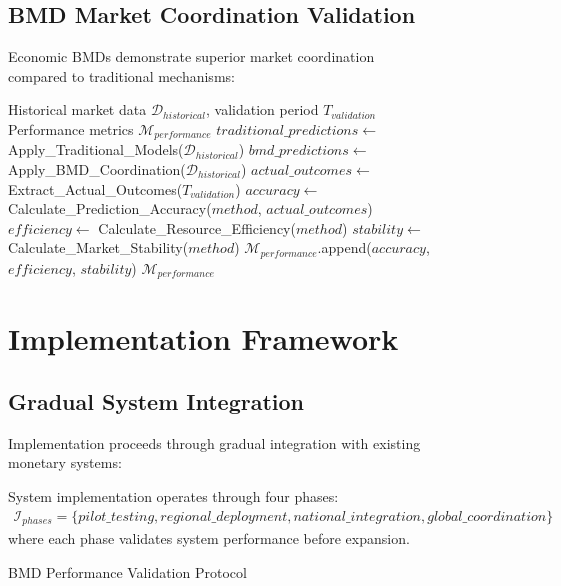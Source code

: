 \begin{figure}[h]
    \subsection{BMD Market Coordination Validation}
    
    Economic BMDs demonstrate superior market coordination compared to traditional mechanisms:
    
    \begin{algorithm}
    \caption{BMD Performance Validation Protocol}
    \begin{algorithmic}[1]
    \REQUIRE Historical market data $\mathcal{D}_{historical}$, validation period $T_{validation}$
    \ENSURE Performance metrics $\mathcal{M}_{performance}$
    \STATE $traditional\_predictions \leftarrow$ Apply\_Traditional\_Models($\mathcal{D}_{historical}$)
    \STATE $bmd\_predictions \leftarrow$ Apply\_BMD\_Coordination($\mathcal{D}_{historical}$)
    \STATE $actual\_outcomes \leftarrow$ Extract\_Actual\_Outcomes($T_{validation}$)
        \STATE $accuracy \leftarrow$ Calculate\_Prediction\_Accuracy($method$, $actual\_outcomes$)
        \STATE $efficiency \leftarrow$ Calculate\_Resource\_Efficiency($method$)
        \STATE $stability \leftarrow$ Calculate\_Market\_Stability($method$)
        \STATE $\mathcal{M}_{performance}$.append($accuracy$, $efficiency$, $stability$)
    \ENDFOR
    \RETURN $\mathcal{M}_{performance}$
    \end{algorithmic}
    \end{algorithm}
    
    \section{Implementation Framework}
    
    \subsection{Gradual System Integration}
    
    Implementation proceeds through gradual integration with existing monetary systems:
    
    \begin{definition}
    System implementation operates through four phases:
    \begin{align}
    \mathcal{I}_{phases} = \{pilot\_testing, regional\_deployment, national\_integration, global\_coordination\}
    \end{align}
    where each phase validates system performance before expansion.
    \end{definition}
    

\end{figure}
